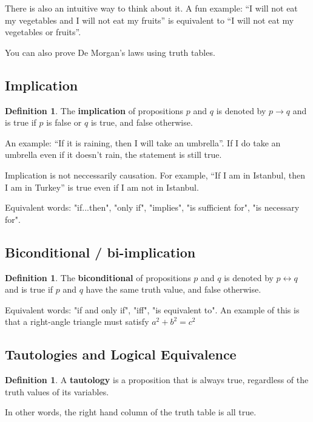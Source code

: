 \documentclass[12pt,a4paper]{article}
\theoremstyle{plain}
\theoremstyle{definition}
\newtheorem{definition}[theorem]{Definition}
\theoremstyle{remark}
\begin{document}
There is also an intuitive way to think about it. A fun example: ``I will not eat my vegetables and I will not eat my fruits'' is equivalent to ``I will not eat my vegetables or fruits''.

You can also prove De Morgan's laws using truth tables.

\subsection{Implication}
\begin{definition}
The \textbf{implication} of propositions $p$ and $q$ is denoted by $p \rightarrow q$ and is true if $p$ is false or $q$ is true, and false otherwise.
\end{definition}

An example: ``If it is raining, then I will take an umbrella''. If I do take an umbrella even if it doesn't rain, the statement is still true.

Implication is not neccessarily causation. For example, ``If I am in Istanbul, then I am in Turkey'' is true even if I am not in Istanbul.

Equivalent words: "if...then", "only if", "implies", "is sufficient for", "is necessary for".

\subsection{Biconditional / bi-implication}
\begin{definition}
The \textbf{biconditional} of propositions $p$ and $q$ is denoted by $p \leftrightarrow q$ and is true if $p$ and $q$ have the same truth value, and false otherwise.
\end{definition}

Equivalent words: "if and only if", "iff", "is equivalent to". An example of this is that a right-angle triangle must satisfy $a^2 + b^2 = c^2$

\subsection{Tautologies and Logical Equivalence}
\begin{definition}
A \textbf{tautology} is a proposition that is always true, regardless of the truth values of its variables.
\end{definition}

In other words, the right hand column of the truth table is all true.
\end{document}
